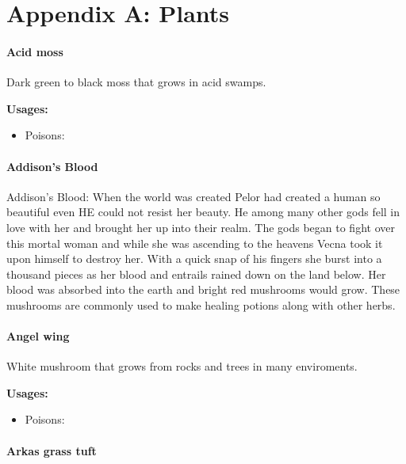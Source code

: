 \chapter*{Appendix A: Plants}

\subsubsection{Acid moss}
\label{Acid moss}

Dark green to black moss that grows in acid swamps.

\vspace{5mm}

\textbf{Usages:}

\begin{itemize}[noitemsep]
\item[] Poisons: \poison
\end{itemize}

\subsubsection{Addison's Blood}
\label{addisons_blood}

Addison's Blood: When the world was created Pelor had created a human so beautiful even HE could not resist her beauty. He among many other gods fell in love with her and brought her up into their realm. The gods began to fight over this mortal woman and while she was ascending to the heavens Vecna took it upon himself to destroy her. With a quick snap of his fingers she burst into a thousand pieces as her blood and entrails rained down on the land below. Her blood was absorbed into the earth and bright red mushrooms would grow. These mushrooms are commonly used to make healing potions along with other herbs.

\subsubsection{Angel wing}
\label{Angel wing}

White mushroom that grows from rocks and trees in many enviroments.

\vspace{5mm}

\textbf{Usages:}

\begin{itemize}[noitemsep]
\item[] Poisons: \poison
\end{itemize}

\subsubsection{Arkas grass tuft}
\label{Arkas grass tuft}

